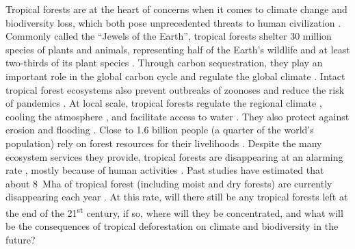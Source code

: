 \documentclass[
  12pt,
]{article}
\begin{document}
\indent Tropical forests are at the heart of concerns when it comes to climate change and biodiversity loss, which both pose unprecedented threats to human civilization \citep{IPCC2014, Cardinale2012}. Commonly called the ``Jewels of the Earth'', tropical forests shelter 30 million species of plants and animals, representing half of the Earth's wildlife and at least two-thirds of its plant species \citep{Gibson2011, Wilson2012}. Through carbon sequestration, they play an important role in the global carbon cycle and regulate the global climate \citep{Baccini2017}. Intact tropical forest ecosystems also prevent outbreaks of zoonoses and reduce the risk of pandemics \citep{Tollefson2020}. At local scale, tropical forests regulate the regional climate \citep{Dickinson1992}, cooling the atmosphere \citep{Ellison2017}, and facilitate access to water \citep{Ellison2017, Zhang2021}. They also protect against erosion and flooding \citep{Bradshaw2007}. Close to 1.6 billion people (a quarter of the world's population) rely on forest resources for their livelihoods \citep{FAO2015}. Despite the many ecosystem services they provide, tropical forests are disappearing at an alarming rate \citep{FAO2015, Hansen2013, Vancutsem2021, Achard2014}, mostly because of human activities \citep{Curtis2018, Geist2002}. Past studies have estimated that about 8~Mha of tropical forest (including moist and dry forests) are currently disappearing each year \citep{FAO2015}. At this rate, will there still be any tropical forests left at the end of the 21\textsuperscript{st} century, if so, where will they be concentrated, and what will be the consequences of tropical deforestation on climate and biodiversity in the future?\\
\end{document}
